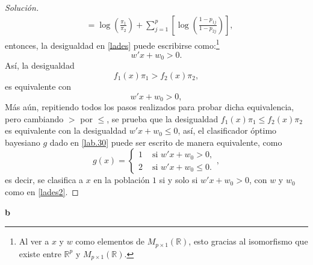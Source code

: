 \documentclass[10.5pt,notitlepage]{article}
\newenvironment{solucion}
  {\begin{proof}[Solución]}
  {\end{proof}}
\newcommand{\RR}{\mathbb{R}}
\newcommand{\corch}[1]{\left[ #1 \right]}
\newcommand{\pare}[1]{\left( #1 \right)}
\theoremstyle{plain}
\begin{document}
\begin{solucion}
\begin{align}
          &= \log\pare{ \frac{\pi_{1}}{\pi_{2}}} + \sum_{j = 1}^{p}\corch{\log\pare{\frac{1 - p_{1j}}{1 - p_{2j}}}},\label{lades2} 
\end{align}
entonces, la desigualdad en \eqref{lades} puede escribirse como:\footnote{Al ver a \(x\) y \(w\) como elementos de \(M_{p\times 1}(\RR)\), esto gracias al isomorfismo que existe entre \(\RR^p\) y \(M_{p\times 1}(\RR)\).} 
\[
  w'x + w_0 > 0. 
\]
Así, la desigualdad 
\[
f_1(x)\pi_{1} > f_{2}(x)\pi_{2},
\]
es equivalente con
\[
  w'x + w_0 > 0,
\]
Más aún, repitiendo todos los pasos realizados para probar dicha equivalencia, pero cambiando \(>\) por \(\leq\), se prueba que la desigualdad \(f_1(x)\pi_{1} \leq f_{2}(x)\pi_{2}\) es equivalente con la desigualdad \(w'x + w_0 \leq 0\), así, el clasificador óptimo bayesiano \(g\) dado en \eqref{lab.30} puede ser escrito de manera equivalente, como
\begin{equation}\label{lab.301}
    g(x) = \begin{cases}
1 & \text{ si }  w'x + w_0 > 0, \\ 
2 & \text{ si }   w'x + w_0 \leq 0.
\end{cases},
\end{equation}
es decir, se clasifica a \(x\) en la población \(1\) si y solo si \(w'x + w_0 > 0\), con \(w\) y \(w_0\) como en \eqref{lades2}.
\end{solucion}
\textbf{b}
\end{document}
